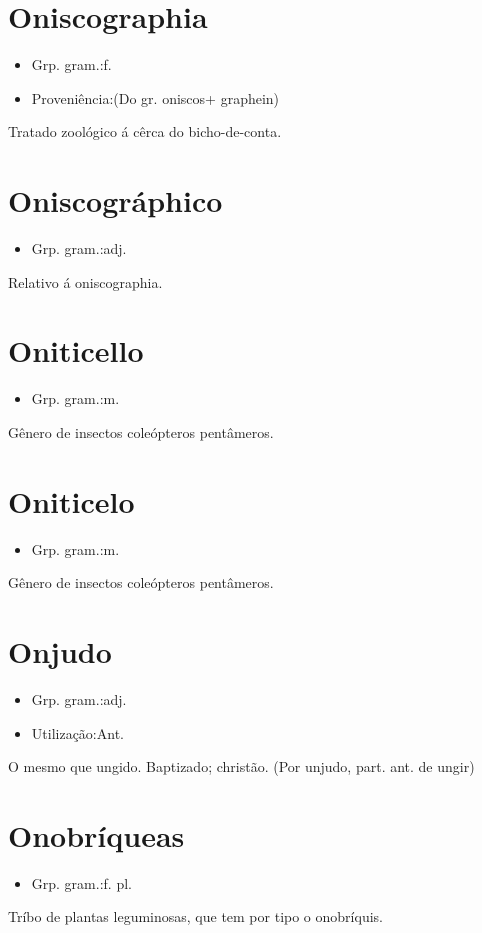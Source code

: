 \section{Oniscographia}
\begin{itemize}
\item {Grp. gram.:f.}
\end{itemize}
\begin{itemize}
\item {Proveniência:(Do gr. \textunderscore oniscos\textunderscore  + \textunderscore graphein\textunderscore )}
\end{itemize}
Tratado zoológico á cêrca do bicho-de-conta.
\section{Oniscográphico}
\begin{itemize}
\item {Grp. gram.:adj.}
\end{itemize}
Relativo á oniscographia.
\section{Oniticello}
\begin{itemize}
\item {Grp. gram.:m.}
\end{itemize}
Gênero de insectos coleópteros pentâmeros.
\section{Oniticelo}
\begin{itemize}
\item {Grp. gram.:m.}
\end{itemize}
Gênero de insectos coleópteros pentâmeros.
\section{Onjudo}
\begin{itemize}
\item {Grp. gram.:adj.}
\end{itemize}
\begin{itemize}
\item {Utilização:Ant.}
\end{itemize}
O mesmo que \textunderscore ungido\textunderscore .
Baptizado; christão.
(Por \textunderscore unjudo\textunderscore , part. ant. de \textunderscore ungir\textunderscore )
\section{Onobríqueas}
\begin{itemize}
\item {Grp. gram.:f. pl.}
\end{itemize}
Tríbo de plantas leguminosas, que tem por tipo o onobríquis.
